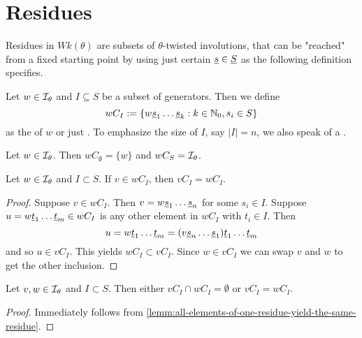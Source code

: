 \section{Residues}
\label{sec:twisted-involutions-residues}

Residues in $Wk(\theta)$ are subsets of $\theta$-twisted involutions, that can be "reached" from a fixed starting point by using just certain $\underline{s} \in \underline{S}$ as the following definition specifies.

\begin{defi}
	Let $w \in \mathcal{I}_{\theta}$ and $I \subseteq S$ be a subset of generators. Then we define
	$$ wC_I := \{ w \underline{s}_1 \ldots \underline{s}_k : k \in \mathbb{N}_0, s_i \in S \} $$
	as the  of $w$ or just . To emphasize the size of $I$, say $|I| = n$, we also speak of a .
\end{defi}

\begin{exam}
	Let $w \in \mathcal{I}_{\theta}$. Then $wC_\emptyset = \{ w \}$ and $wC_S = \mathcal{I}_{\theta}$.
\end{exam}

\begin{lemm}
	Let $w \in \mathcal{I}_{\theta}$ and $I \subset S$. If $v \in wC_I$, then $vC_I = wC_I$.

	\begin{proof}
		Suppose $v \in wC_I$. Then $v = w \underline{s}_1 \ldots \underline{s}_n$ for some $s_i \in I$. Suppose $u = w \underline{t}_1 \ldots \underline{t}_m \in wC_I$ is any other element in $wC_I$ with $t_i \in I$. Then
		$$ u = w \underline{t}_1 \ldots \underline{t}_m = (v \underline{s}_n \ldots \underline{s}_1) \underline{t}_1 \ldots \underline{t}_m $$
		and so $u \in vC_I$. This yields $wC_I \subset vC_I$. Since $w \in vC_I$ we can swap $v$ and $w$ to get the other inclusion.
	\end{proof}
\end{lemm}

\begin{coro}
	Let $v, w \in \mathcal{I}_{\theta}$ and $I \subset S$. Then either $vC_I \cap wC_I = \emptyset$ or $vC_I = wC_I$.

	\begin{proof}
		Immediately follows from \ref{lemm:all-elements-of-one-residue-yield-the-same-residue}.
	\end{proof}
\end{coro}

